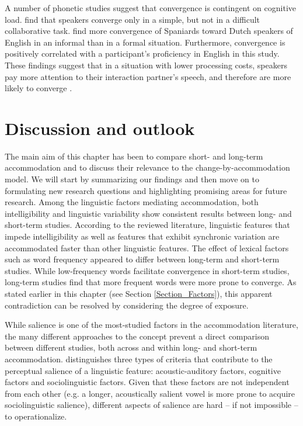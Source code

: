 \documentclass[output=paper]{langscibook}
\begin{document}
A number of phonetic studies suggest that convergence is contingent on cognitive load. \textcite{abel_cognitive_2016} find that speakers converge only in a simple, but not in a difficult collaborative task. \textcite{berry_phonetic_2017} find more convergence of Spaniards toward Dutch speakers of English in an informal than in a formal situation. Furthermore, convergence is positively correlated with a participant's proficiency in English in this study. These findings suggest that in a situation with lower processing costs, speakers pay more attention to their interaction partner's speech, and therefore are more likely to converge \citep{yu_phonetic_2013,abel_phonetic_2011,berry_phonetic_2017}.

\section{Discussion and outlook} \label{Section_Discussion}

The main aim of this chapter has been to compare short- and long-term accommodation and to discuss their relevance to the change-by-accommodation model. We will start by summarizing our findings and then move on to formulating new research questions and highlighting promising areas for future research.
Among the linguistic factors mediating accommodation, both intelligibility and linguistic variability show consistent results between long- and short-term studies. According to the reviewed literature, linguistic features that impede intelligibility as well as features that exhibit synchronic variation are accommodated faster than other linguistic features. The effect of lexical factors such as word frequency appeared to differ between long-term and short-term studies. While low-frequency words facilitate convergence in short-term studies, long-term studies find that more frequent words were more prone to converge. As stated earlier in this chapter (see Section \ref{Section_Factors}), this apparent contradiction can be resolved by considering the degree of exposure. 

While salience is one of the most-studied factors in the accommodation literature, the many different approaches to the concept prevent a direct comparison between different studies, both across and within long- and short-term accommodation. \textcite{auer_anmerkungen_2014} distinguishes three types of criteria that contribute to the perceptual salience of a linguistic feature: acoustic-auditory factors, cognitive factors and sociolinguistic factors. Given that these factors are not independent from each other (e.g. a longer, acoustically salient vowel is more prone to acquire sociolinguistic salience), different aspects of salience are hard – if not impossible – to operationalize.
\end{document}
